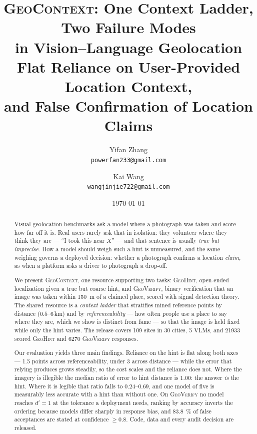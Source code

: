 \documentclass[10pt,a4paper]{article}
\title{\textsc{GeoContext}: One Context Ladder, Two Failure Modes\\
in Vision--Language Geolocation\\
\large Flat Reliance on User-Provided Location Context,\\
and False Confirmation of Location Claims}
\author{
  Yifan Zhang\\
  \small \texttt{powerfan233@gmail.com}
  \and
  Kai Wang\\
  \small \texttt{wangjinjie722@gmail.com}
}
\date{\today}
\begin{document}
\maketitle

\begin{abstract}
Visual geolocation benchmarks ask a model where a photograph was taken and score
how far off it is. Real users rarely ask that in isolation: they volunteer where
they think they are --- ``I took this near $X$'' --- and that sentence is usually
\emph{true but imprecise}. How a model should weigh such a hint is unmeasured,
and the same weighing governs a deployed decision: whether a photograph confirms
a location \emph{claim}, as when a platform asks a driver to photograph a
drop-off.

We present \textsc{GeoContext}, one resource supporting two tasks:
\textsc{GeoHint}, open-ended localization given a true but coarse hint, and
\textsc{GeoVerify}, binary verification that an image was taken within
\SI{150}{\metre} of a claimed place, scored with signal detection theory. The
shared resource is a \emph{context ladder} that stratifies mined reference
points by distance ($0.5$--$6$\,\si{\kilo\metre}) and by
\emph{referenceability} --- how often people use a place to say where they are,
which we show is distinct from fame --- so that the image is held fixed while
only the hint varies. The
release covers \num{109} sites in \num{30} cities, \num{5} VLMs, and
\num{21933} scored \textsc{GeoHint} and \num{6270} \textsc{GeoVerify}
responses.

Our evaluation yields three main findings. Reliance on the hint is flat along both axes --- \num{1.5}
points across referenceability, under \num{3} across distance --- while the
error that relying produces grows steadily, so the cost scales and the reliance
does not. Where the imagery is illegible the median ratio of error to hint
distance is $1.00$: the answer \emph{is} the hint. Where it is legible that
ratio falls to \numrange{0.24}{0.69}, and one model of five is measurably less
accurate with a hint than without one. On \textsc{GeoVerify} no model reaches
$d'=1$ at the tolerance a deployment needs, ranking by accuracy inverts the
ordering because models differ sharply in response bias, and
\SI{83.8}{\percent} of false acceptances are stated at confidence
$\geq\num{0.8}$. Code, data and every audit decision are released.
\end{abstract}
\end{document}
